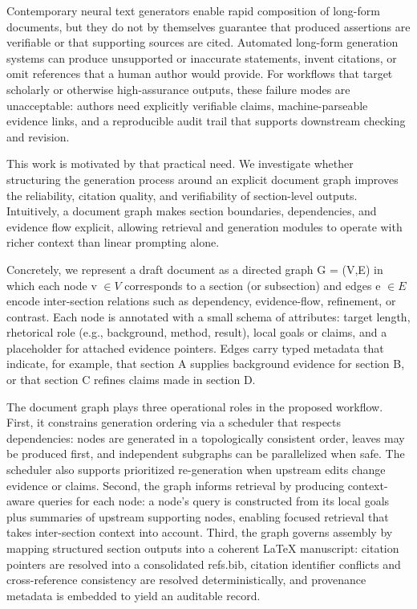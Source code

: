 Contemporary neural text generators enable rapid composition of long-form documents, but they do not by themselves guarantee that produced assertions are verifiable or that supporting sources are cited.
Automated long-form generation systems can produce unsupported or inaccurate statements, invent citations, or omit references that a human author would provide.
For workflows that target scholarly or otherwise high-assurance outputs, these failure modes are unacceptable: authors need explicitly verifiable claims, machine-parseable evidence links, and a reproducible audit trail that supports downstream checking and revision.

This work is motivated by that practical need.
We investigate whether structuring the generation process around an explicit document graph improves the reliability, citation quality, and verifiability of section-level outputs.
Intuitively, a document graph makes section boundaries, dependencies, and evidence flow explicit, allowing retrieval and generation modules to operate with richer context than linear prompting alone.

Concretely, we represent a draft document as a directed graph G = (V,E) in which each node v $\in V$ corresponds to a section (or subsection) and edges e $\in E$ encode inter-section relations such as dependency, evidence-flow, refinement, or contrast.
Each node is annotated with a small schema of attributes: target length, rhetorical role (e.g., background, method, result), local goals or claims, and a placeholder for attached evidence pointers.
Edges carry typed metadata that indicate, for example, that section A supplies background evidence for section B, or that section C refines claims made in section D.

The document graph plays three operational roles in the proposed workflow.
First, it constrains generation ordering via a scheduler that respects dependencies: nodes are generated in a topologically consistent order, leaves may be produced first, and independent subgraphs can be parallelized when safe.
The scheduler also supports prioritized re-generation when upstream edits change evidence or claims.
Second, the graph informs retrieval by producing context-aware queries for each node: a node's query is constructed from its local goals plus summaries of upstream supporting nodes, enabling focused retrieval that takes inter-section context into account.
Third, the graph governs assembly by mapping structured section outputs into a coherent LaTeX manuscript: citation pointers are resolved into a consolidated refs.bib, citation identifier conflicts and cross-reference consistency are resolved deterministically, and provenance metadata is embedded to yield an auditable record.

